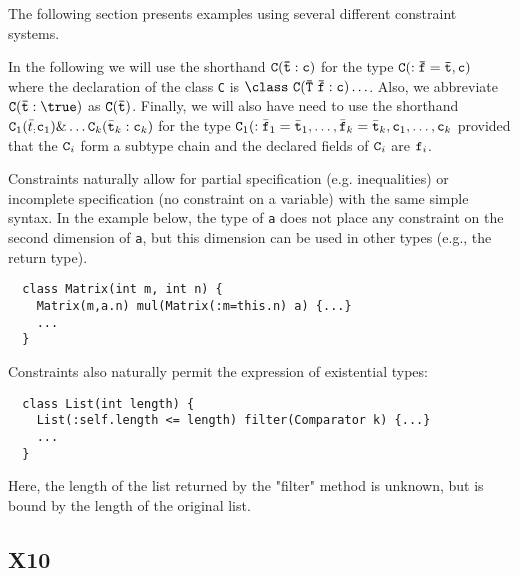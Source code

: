 %
%
%
%
%
%

The following section presents examples using several different
constraint systems.

In the following we will use the shorthand $\tt C(\bar{t}:c)$ for the
type $\tt C(:\bar{f}=\bar{t},c)$ where the declaration of the class
{\tt C} is $\tt \class\ C(\bar{\tt T}\ \bar{\tt f}:c)\ldots$.  Also,
we abbreviate $\tt C(\bar{t}:\true)$ as $\tt C(\bar{t})$.  Finally, we
will also have need to use the shorthand ${\tt C}_1(\bar{t}_:{\tt
c}_1)\& \ldots {\tt C}_k(\bar{\tt t}_k:{\tt c}_k)$ for the type
${\tt C}_1(:\bar{\tt f}_1=\bar{\tt t}_1, \ldots, \bar{\tt
f}_k=\bar{\tt t}_k,{\tt c}_1,\ldots,{\tt c}_k$ 
provided that the ${\tt C}_i$ form a subtype chain
and the declared fields of ${\tt C}_i$ are ${\tt f}_i$.

Constraints naturally allow for partial specification
(e.g. inequalities) or incomplete specification (no constraint on a
variable) with the same simple syntax. In the example below,
the type of {\tt a} does not place any constraint on the second
dimension of {\tt a}, but this dimension can be used in other
types (e.g., the return type).
{\footnotesize
\begin{verbatim}
  class Matrix(int m, int n) {
    Matrix(m,a.n) mul(Matrix(:m=this.n) a) {...}
    ...
  }
\end{verbatim}}

Constraints also naturally permit the expression of existential types:
{\footnotesize
\begin{verbatim}
  class List(int length) { 
    List(:self.length <= length) filter(Comparator k) {...} 
    ...
  }
\end{verbatim}}
\noindent
Here, the length of the list returned by the "filter" method is 
unknown, but is bound by the length of the original list.

\subsection{X10}


